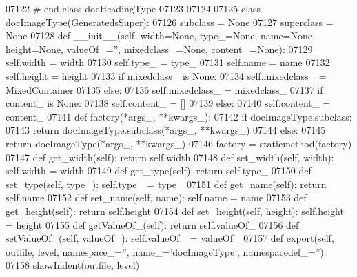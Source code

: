\begin{DoxyCode}
{{{{{{{{{{{{{{{{{{{{{{{{{{{{{{{{{{{{{{{{{{{{{{{{{{{{{{{{{{{{{{{{{{{{{{{{{{{{{{{{{{{{{{{{{{{{{{{{{{{{{{{{{{{{{{{{{{{{{{{{{{{{{{{{{{{{{{{{{{{{{{{{{{{{{{{{{{{{{{{{{{{{{{{{{{{{{{{{{{{{{{{{{{{{{{{{{{{{{{{{{{{{{{{{{{{{{{{{{{{{{{{{{{{{{{{{{{{{{{{{{{{{{{{{{{{{{{{{{{{{{{{{{{{{{{{{{{{{{{{{{{{{{{{{{{{{{{{{{{{{{{{{{{{{{{{{{{{{{{{{{{{{{{{{{{{{{{{{{{{{{{{{{{{{{{{{{{{{{{{{{{{{{{{{{{{{{{{{{{{{{{{{{{{{{{{{{{{{{{{{{{{{{{{{{{{{{{{{{{{{{{{{{{{{{{{{{{{{{{{{{07122 \textcolor{comment}{# end class docHeadingType}
07123 
07124 
07125 \textcolor{keyword}{class }docImageType(GeneratedsSuper):
07126     subclass = \textcolor{keywordtype}{None}
07127     superclass = \textcolor{keywordtype}{None}
07128     \textcolor{keyword}{def }__init__(self, width=None, type\_=None, name=None, height=None, valueOf\_='', mixedclass\_=None, 
      content\_=None):
07129         self.width = width
07130         self.type_ = type\_
07131         self.name = name
07132         self.height = height
07133         \textcolor{keywordflow}{if} mixedclass\_ \textcolor{keywordflow}{is} \textcolor{keywordtype}{None}:
07134             self.mixedclass_ = MixedContainer
07135         \textcolor{keywordflow}{else}:
07136             self.mixedclass_ = mixedclass\_
07137         \textcolor{keywordflow}{if} content\_ \textcolor{keywordflow}{is} \textcolor{keywordtype}{None}:
07138             self.content_ = []
07139         \textcolor{keywordflow}{else}:
07140             self.content_ = content\_
07141     \textcolor{keyword}{def }factory(*args\_, **kwargs\_):
07142         \textcolor{keywordflow}{if} docImageType.subclass:
07143             \textcolor{keywordflow}{return} docImageType.subclass(*args\_, **kwargs\_)
07144         \textcolor{keywordflow}{else}:
07145             \textcolor{keywordflow}{return} docImageType(*args\_, **kwargs\_)
07146     factory = staticmethod(factory)
07147     \textcolor{keyword}{def }get_width(self): \textcolor{keywordflow}{return} self.width
07148     \textcolor{keyword}{def }set_width(self, width): self.width = width
07149     \textcolor{keyword}{def }get_type(self): \textcolor{keywordflow}{return} self.type\_
07150     \textcolor{keyword}{def }set_type(self, type\_): self.type\_ = type\_
07151     \textcolor{keyword}{def }get_name(self): \textcolor{keywordflow}{return} self.name
07152     \textcolor{keyword}{def }set_name(self, name): self.name = name
07153     \textcolor{keyword}{def }get_height(self): \textcolor{keywordflow}{return} self.height
07154     \textcolor{keyword}{def }set_height(self, height): self.height = height
07155     \textcolor{keyword}{def }getValueOf_(self): \textcolor{keywordflow}{return} self.valueOf\_
07156     \textcolor{keyword}{def }setValueOf_(self, valueOf\_): self.valueOf\_ = valueOf\_
07157     \textcolor{keyword}{def }export(self, outfile, level, namespace\_='', name\_='docImageType', namespacedef\_=''):
07158         showIndent(outfile, level)
}}}}}}}}}}}}}}}}}}}}}}}}}}}}}}}}}}}}}}}}}}}}}}}}}}}}}}}}}}}}}}}}}}}}}}}}}}}}}}}}}}}}}}}}}}}}}}}}}}}}}}}}}}}}}}}}}}}}}}}}}}}}}}}}}}}}}}}}}}}}}}}}}}}}}}}}}}}}}}}}}}}}}}}}}}}}}}}}}}}}}}}}}}}}}}}}}}}}}}}}}}}}}}}}}}}}}}}}}}}}}}}}}}}}}}}}}}}}}}}}}}}}}}}}}}}}}}}}}}}}}}}}}}}}}}}}}}}}}}}}}}}}}}}}}}}}}}}}}}}}}}}}}}}}}}}}}}}}}}}}}}}}}}}}}}}}}}}}}}}}}}}}}}}}}}}}}}}}}}}}}}}}}}}}}}}}}}}}}}}}}}}}}}}}}}}}}}}}}}}}}}}}}}}}}}}}}}}}}}}}}}}}}}}}}}}}}}}}}}}}}
\end{DoxyCode}
